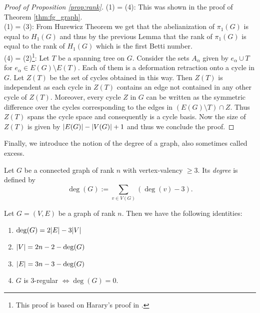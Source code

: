 \begin{proof}[Proof of Proposition \ref{prop:rank}]
	(1) = (4): This was shown in the proof of Theorem \ref{thm:fg_graph}.\\
	(1) = (3): From Hurewicz Theorem we get that the abelianization of $\pi_{1}(G)$ is equal to $H_{1}(G)$
	and thus by the previous Lemma that the rank of $\pi_1(G)$ is equal to the rank of $H_1(G)$ which is the first Betti number.\\
	(4) = (2)\footnote{This proof is based on Harary's proof in \cite[p. 37-40]{harary69}.}:
	Let $T$ be a spanning tree on $G$. Consider the sets $A_{\alpha}$ given by $e_{\alpha} \cup T$ for $e_{\alpha} \in E(G) \setminus E(T)$.
	Each of them is a deformation retraction onto a cycle in $G$. Let $Z(T)$ be the set of cycles obtained in this way. 
	Then  $Z(T)$ is independent as each cycle in $Z(T)$ contains an edge not contained in any other cycle of $Z(T)$.
	Moreover, every cycle $Z$ in $G$ can be written as the symmetric difference over the cycles corresponding to the edges in $(E(G) \setminus T) \cap Z$.
	Thus $Z(T)$ spans the cycle space and consequently is a cycle basis. Now the size of $Z(T)$ is given by $\abs{E(G)} - \abs{V(G)} + 1$ and thus we conclude the proof.
\end{proof}

Finally, we introduce the notion of the degree of a graph, also sometimes called excess.
\begin{definition}
	Let $G$ be a connected graph of rank $n$ with vertex-valency $\geq 3$. Its \emph{degree} is defined by
	\[
		\deg(G) := \sum_{v \in V(G)} (\deg(v) - 3)
	.\] 
\end{definition}

\begin{proposition}
	Let $G = (V,E)$ be a graph of rank $n$. Then we have the following identities:
	\begin{enumerate}
		\item $\deg(G) = 2 \abs{E} - 3 \abs{V}$
		\item $\abs{V} = 2n -2 - \deg(G)$
		\item $\abs{E} = 3n - 3 - \deg(G)$
		\item $G$ is $3$-regular $\Leftrightarrow \deg(G) = 0$.
	\end{enumerate}	
\end{proposition}

